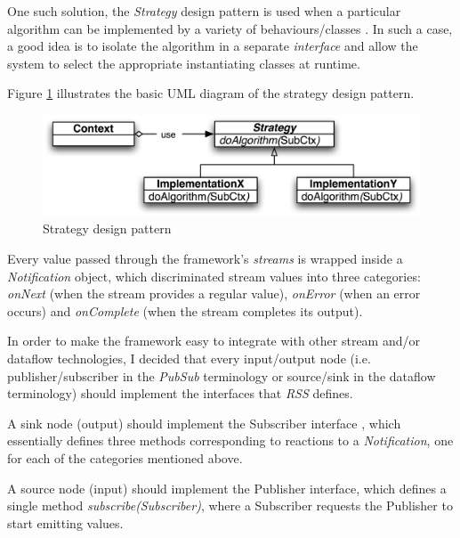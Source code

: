 \documentclass{dithesis}
\begin{document}
One such solution, the \textit{Strategy} design pattern is used when a particular algorithm can be implemented by a variety of behaviours/classes \cite{design}. In such a case, a good idea is to isolate the algorithm in a separate \textit{interface} and allow the system to select the appropriate instantiating classes at runtime.

Figure \ref{fig:strategy} illustrates the basic UML diagram of the strategy design pattern.

\begin{figure}[h!] 
	\centering
	\includegraphics[scale=0.1]{strategy}
  	\caption{Strategy design pattern}
  	\label{fig:strategy}
\end{figure}

Every value passed through the framework's \textit{streams} is wrapped inside a \textit{Notification} object, which discriminated stream values into three categories: \textit{onNext} (when the stream provides a regular value), \textit{onError} (when an error occurs) and \textit{onComplete} (when the stream completes its output).

In order to make the framework easy to integrate with other stream and/or dataflow technologies, I decided that every input/output node (i.e. publisher/subscriber in the \textit{PubSub} terminology or source/sink in the dataflow terminology) should implement the interfaces that \textit{RSS} defines.

A sink node (output) should implement the Subscriber interface , which essentially defines three methods corresponding to reactions to a \textit{Notification}, one for each of the categories mentioned above. 

A source node (input) should implement the Publisher interface, which defines a single method \textit{subscribe(Subscriber)}, where a Subscriber requests the Publisher to start emitting values. 
\end{document}
